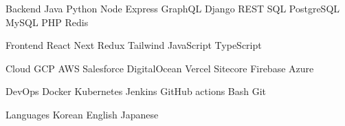 

\begin{cvskills}

  \cvskill
    {Backend} %
    {Java \cpshalf Python \cpshalf Node \cpshalf Express \cpshalf GraphQL \cpshalf Django \cpshalf REST \cpshalf SQL \cpshalf PostgreSQL \cpshalf MySQL \cpshalf PHP \cpshalf Redis} %

  \cvskill
    {Frontend} %
    {React \cpshalf Next \cpshalf Redux \cpshalf Tailwind \cpshalf JavaScript \cpshalf TypeScript} %

  \cvskill
    {Cloud} %
    {GCP \cpshalf AWS \cpshalf Salesforce \cpshalf DigitalOcean \cpshalf Vercel \cpshalf Sitecore \cpshalf Firebase \cpshalf Azure} %

  \cvskill
    {DevOps} %
    {Docker \cpshalf Kubernetes \cpshalf Jenkins \cpshalf GitHub actions \cpshalf Bash \cpshalf Git} %

  \cvskill
    {Languages} %
    {Korean \cpshalf English \cpshalf Japanese} %

\end{cvskills}
